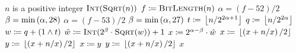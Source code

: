 \begin{algorithm}[t]
\caption{Integer Square Root algorithm using floating-point sqrt (further improved)}
\label{alg:isqrt_float_3}
\begin{algorithmic}[1]
\Require $n$ is a positive integer
        \State \Return $\textsc{Int}(\textsc{Sqrt}(n))$
    \EndIf
    \State $f \coloneqq{} \textsc{BitLength}(n)$
        \State $\alpha = (f - 52)/2$
        \State $\beta = \min\left( \alpha, 28 \right)$
    \Else
        \State $\alpha = (f - 53)/2$
        \State $\beta = \min\left( \alpha, 27 \right)$
    \EndIf
    \State $t \coloneqq{} \left\lfloor n/2^{2\alpha+1} \right\rfloor$
    \State $q \coloneqq{} \left\lfloor n/2^{2\alpha} \right\rfloor$
    \State $w \coloneqq{} q + (1\land t)$
        \label{lst:isqrt_float_3_logical_and}
    \State $\hat{w} \coloneqq{} \textsc{Int}(2^{\beta}\cdot\textsc{Sqrt}(w))+1$
    \State $x \coloneqq{} 2^{\alpha-\beta}\cdot\hat{w}$
    \State $x \coloneqq{} \left\lfloor \left( x + n/x \right)/2 \right\rfloor$
    \State $y \coloneqq{} \left\lfloor \left( x + n/x \right)/2 \right\rfloor$
        \State $x \coloneqq{} y$
        \State $y \coloneqq{} \left\lfloor \left( x + n/x \right)/2 \right\rfloor$
    \EndWhile
    \State \Return $x$
\EndProcedure
\end{algorithmic}
\end{algorithm}

